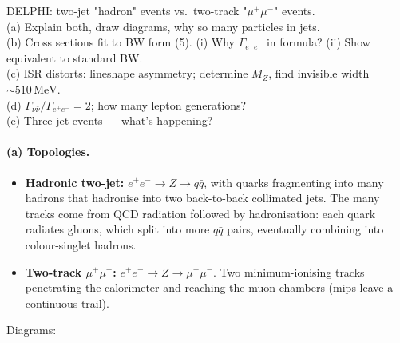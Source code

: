 \documentclass[11pt]{article}
\newcommand{\Q}[1]{\begin{question}#1\end{question}}
\newcommand{\MeV}{\,\mathrm{MeV}}
\newcommand{\fphoton}[2]{\draw[decorate, decoration={snake, amplitude=0.6mm, segment length=2mm}] (#1) -- (#2);}
\begin{document}
\Q{DELPHI: two-jet "hadron" events vs.\ two-track "$\mu^+\mu^-$" events.\\
(a) Explain both, draw diagrams, why so many particles in jets.\\
(b) Cross sections fit to BW form (5). (i) Why $\Gamma_{e^+e^-}$ in formula? (ii) Show equivalent to standard BW.\\
(c) ISR distorts: lineshape asymmetry; determine $M_Z$, find invisible width $\sim 510\MeV$.\\
(d) $\Gamma_{\nu\bar\nu}/\Gamma_{e^+e^-}=2$; how many lepton generations?\\
(e) Three-jet events --- what's happening?}

\paragraph{(a) Topologies.}
\begin{itemize}[itemsep=1pt]
\item \textbf{Hadronic two-jet:} $e^+e^-\to Z\to q\bar q$, with quarks fragmenting into many hadrons that hadronise into two back-to-back collimated jets. The many tracks come from QCD radiation followed by hadronisation: each quark radiates gluons, which split into more $q\bar q$ pairs, eventually combining into colour-singlet hadrons.
\item \textbf{Two-track $\mu^+\mu^-$:} $e^+e^-\to Z\to\mu^+\mu^-$. Two minimum-ionising tracks penetrating the calorimeter and reaching the muon chambers (mips leave a continuous trail).
\end{itemize}

Diagrams:
\begin{center}
\end{center}
\end{document}

